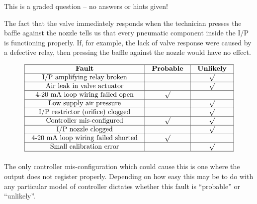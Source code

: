 \vfil 

\eject






This is a graded question -- no answers or hints given!







The fact that the valve immediately responds when the technician presses the baffle against the nozzle tells us that every pneumatic component inside the I/P is functioning properly.  If, for example, the lack of valve response were caused by a defective relay, then pressing the baffle against the nozzle would have no effect.


$$\vbox{\offinterlineskip
\halign{\strut
\vrule \quad\hfil # \ \hfil & 
\vrule \quad\hfil # \ \hfil & 
\vrule \quad\hfil # \ \hfil \vrule \cr
\noalign{\hrule}
%
{\bf Fault} & {\bf Probable} & {\bf Unlikely} \cr
%
\noalign{\hrule}
%
I/P amplifying relay broken &  & $\surd$ \cr
%
\noalign{\hrule}
%
Air leak in valve actuator &  & $\surd$ \cr
%
\noalign{\hrule}
%
4-20 mA loop wiring failed open & $\surd$  & \cr
%
\noalign{\hrule}
%
Low supply air pressure &  & $\surd$ \cr
%
\noalign{\hrule}
%
I/P restrictor (orifice) clogged &  & $\surd$ \cr
%
\noalign{\hrule}
%
Controller mis-configured & $\surd$ & $\surd$ \cr
%
\noalign{\hrule}
%
I/P nozzle clogged &  & $\surd$ \cr
%
\noalign{\hrule}
%
4-20 mA loop wiring failed shorted & $\surd$  & \cr
%
\noalign{\hrule}
%
Small calibration error &  & $\surd$ \cr
%
\noalign{\hrule}
} %
}$$ %

The only controller mis-configuration which could cause this is one where the output does not register properly.  Depending on how easy this may be to do with any particular model of controller dictates whether this fault is ``probable'' or ``unlikely''.




